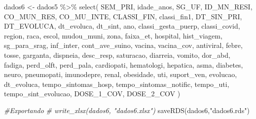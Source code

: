 \documentclass[
]{article}
\newenvironment{Shaded}{\begin{snugshade}}{\end{snugshade}}
\newcommand{\CommentTok}[1]{\textcolor[rgb]{0.56,0.35,0.01}{\textit{#1}}}
\newcommand{\FunctionTok}[1]{\textcolor[rgb]{0.00,0.00,0.00}{#1}}
\newcommand{\NormalTok}[1]{#1}
\newcommand{\OtherTok}[1]{\textcolor[rgb]{0.56,0.35,0.01}{#1}}
\newcommand{\SpecialCharTok}[1]{\textcolor[rgb]{0.00,0.00,0.00}{#1}}
\newcommand{\StringTok}[1]{\textcolor[rgb]{0.31,0.60,0.02}{#1}}
\begin{document}
\begin{Shaded}
\begin{Highlighting}[]
\NormalTok{dados6 }\OtherTok{\textless{}{-}}\NormalTok{ dados5 }\SpecialCharTok{\%\textgreater{}\%} 
  \FunctionTok{select}\NormalTok{(}
\NormalTok{    SEM\_PRI,}
\NormalTok{    idade\_anos,}
\NormalTok{    SG\_UF,}
\NormalTok{    ID\_MN\_RESI,}
\NormalTok{    CO\_MUN\_RES,}
\NormalTok{    CO\_MU\_INTE,}
\NormalTok{    CLASSI\_FIN,}
\NormalTok{    classi\_fin1,}
\NormalTok{    DT\_SIN\_PRI,}
\NormalTok{    DT\_EVOLUCA,}
\NormalTok{    dt\_evoluca, }
\NormalTok{    dt\_sint,}
\NormalTok{    ano,}
\NormalTok{    classi\_gesta\_puerp,}
\NormalTok{    classi\_covid,}
\NormalTok{    region,}
\NormalTok{    raca,}
\NormalTok{    escol,}
\NormalTok{    mudou\_muni,}
\NormalTok{    zona,}
\NormalTok{    faixa\_et,}
\NormalTok{    hospital,}
\NormalTok{    hist\_viagem,}
\NormalTok{    sg\_para\_srag,}
\NormalTok{    inf\_inter,}
\NormalTok{    cont\_ave\_suino,}
\NormalTok{    vacina,}
\NormalTok{    vacina\_cov,}
\NormalTok{    antiviral,}
\NormalTok{    febre,}
\NormalTok{    tosse,}
\NormalTok{    garganta,}
\NormalTok{    dispneia,}
\NormalTok{    desc\_resp,}
\NormalTok{    saturacao,}
\NormalTok{    diarreia,}
\NormalTok{    vomito,}
\NormalTok{    dor\_abd,}
\NormalTok{    fadiga,}
\NormalTok{    perd\_olft,}
\NormalTok{    perd\_pala,}
\NormalTok{    cardiopati,}
\NormalTok{    hematologi,}
\NormalTok{    hepatica,}
\NormalTok{    asma,}
\NormalTok{    diabetes,}
\NormalTok{    neuro,}
\NormalTok{    pneumopati,}
\NormalTok{    imunodepre,}
\NormalTok{    renal,}
\NormalTok{    obesidade,}
\NormalTok{    uti,}
\NormalTok{    suport\_ven,}
\NormalTok{    evolucao,}
\NormalTok{    dt\_evoluca,}
\NormalTok{    tempo\_sintomas\_hosp,}
\NormalTok{    tempo\_sintomas\_notific,}
\NormalTok{    tempo\_uti,}
\NormalTok{    tempo\_sint\_evolucao,}
\NormalTok{    DOSE\_1\_COV,}
\NormalTok{    DOSE\_2\_COV}
\NormalTok{)}

\CommentTok{\#Exportando}
\CommentTok{\# write\_xlsx(dados6, "dados6.xlsx")}
\FunctionTok{saveRDS}\NormalTok{(dados6,}\StringTok{"dados6.rds"}\NormalTok{)}
\end{Highlighting}
\end{Shaded}
\end{document}
